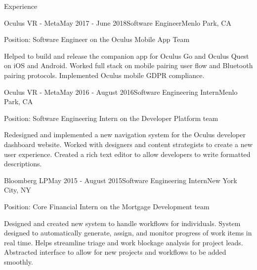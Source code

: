 \documentclass{resume} %
\begin{document}

\begin{rSection}{Experience}

  \begin{rSubsection}{Oculus VR - Meta}{May 2017 - June 2018}{Software Engineer}{Menlo Park, CA}
  \item Position: Software Engineer on the Oculus Mobile App Team
  \item Helped to build and release the companion app for Oculus Go and Oculus Quest on iOS and Android. Worked full stack on mobile pairing user flow and Bluetooth pairing protocols. Implemented Oculus mobile GDPR compliance. 
  \end{rSubsection}


  \begin{rSubsection}{Oculus VR - Meta}{May 2016 - August 2016}{Software Engineering Intern}{Menlo Park, CA}
  \item Position: Software Engineering Intern on the Developer Platform team
  \item Redesigned and implemented a new navigation system for the Oculus developer dashboard website. Worked with designers and content strategists to create a new user experience. Created a rich text editor to allow developers to write formatted descriptions. 
  \end{rSubsection}



  \begin{rSubsection}{Bloomberg LP}{May 2015 - August 2015}{Software Engineering Intern}{New York City, NY}
  \item Position: Core Financial Intern on the Mortgage Development team
  \item Designed and created new system to handle workflows for individuals. System designed to automatically generate, assign, and monitor progress of work items in real time. Helps streamline triage and work blockage analysis for project leads. Abstracted interface to allow for new projects and workflows to be added smoothly. 
\end{rSubsection}


\end{rSection}
\end{document}
